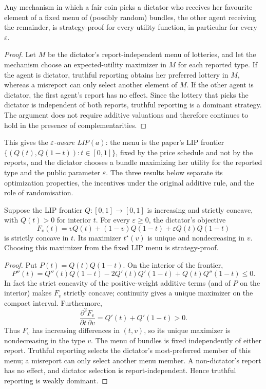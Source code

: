 \begin{proposition}\label{prop:menu}
Any mechanism in which a fair coin picks a dictator who receives her favourite element of a
fixed menu of (possibly random) bundles, the other agent receiving the remainder, is
strategy-proof for every utility function, in particular for every $\varepsilon$.
\end{proposition}
\begin{proof}
Let $M$ be the dictator's report-independent menu of lotteries, and let the
mechanism choose an expected-utility maximizer in $M$ for each reported type.
If the agent is dictator, truthful reporting obtains her preferred lottery in
$M$, whereas a misreport can only select another element of $M$. If the other
agent is dictator, the first agent's report has no effect. Since the lottery
that picks the dictator is independent of both reports, truthful reporting is
a dominant strategy. The argument does not require additive valuations and
therefore continues to hold in the presence of complementarities.
\end{proof}

This gives the \emph{$\varepsilon$-aware LIP$(a)$}: the menu is the paper's LIP frontier
$\{(Q(t),Q(1-t)):t\in[0,1]\}$, fixed by the price schedule and not by the reports, and the
dictator chooses a bundle maximizing her utility for the reported type and the public
parameter $\varepsilon$. The three results below separate its optimization properties,
the incentives under the original additive rule, and the role of randomisation.

\begin{proposition}
\label{prop:eps_lip_properties}
Suppose the LIP frontier $Q:[0,1]\to[0,1]$ is increasing and strictly concave,
with $Q(t)>0$ for interior $t$. For every $\varepsilon\ge0$, the dictator's objective
\[
F_v(t)=vQ(t)+(1-v)Q(1-t)+\varepsilon Q(t)Q(1-t)
\]
is strictly concave in $t$. Its maximizer $t^\star(v)$ is unique and
nondecreasing in $v$. Choosing this maximizer from the fixed LIP menu
is strategy-proof.
\end{proposition}
\begin{proof}
Put $P(t)=Q(t)Q(1-t)$. On the interior of the frontier,
\[
P''(t)=Q''(t)Q(1-t)-2Q'(t)Q'(1-t)+Q(t)Q''(1-t)\le0.
\]
In fact the strict concavity of the positive-weight additive terms (and of $P$
on the interior) makes $F_v$ strictly concave; continuity gives a unique
maximizer on the compact interval. Furthermore,
\[
\frac{\partial^2 F_v}{\partial t\,\partial v}
=Q'(t)+Q'(1-t)>0.
\]
Thus $F_v$ has increasing differences in $(t,v)$, so its unique maximizer is
nondecreasing in the type $v$. The menu of bundles is fixed
independently of either report. Truthful reporting selects the dictator's
most-preferred member of this menu; a misreport can only select another
menu member. A non-dictator's report has no effect, and dictator selection
is report-independent. Hence truthful reporting is weakly dominant.
\end{proof}

